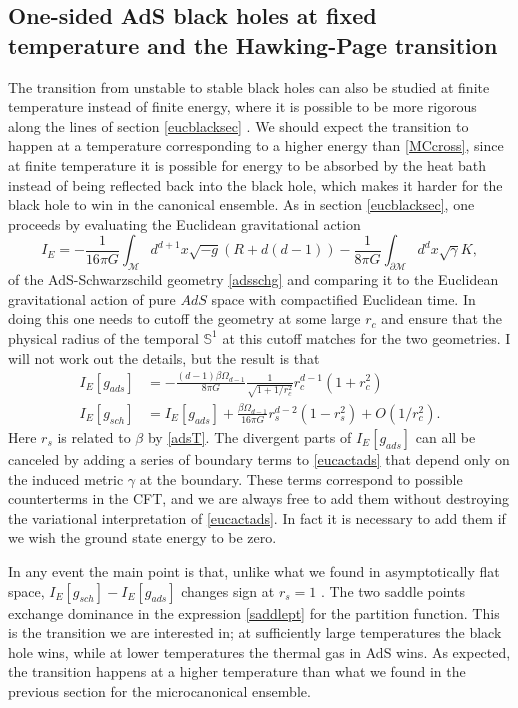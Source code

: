\documentclass[12pt]{article}
\newcommand{\be}{\begin{equation}}
\newcommand{\ee}{\end{equation}}
\begin{document}
\subsection{One-sided AdS black holes at fixed temperature and the Hawking-Page transition}
The transition from unstable to stable black holes can also be studied at finite temperature instead of finite energy, where it is possible to be more rigorous along the lines of section \eqref{eucblacksec} \cite{Hawking:1982dh,Witten:1998zw}.  We should expect the transition to happen at a temperature corresponding to a higher energy than \eqref{MCcross}, since at finite temperature it is possible for energy to be absorbed by the heat bath instead of being reflected back into the black hole, which makes it harder for the black hole to win in the canonical ensemble.  As in section \eqref{eucblacksec}, one proceeds by evaluating the Euclidean gravitational action 
\be\label{eucactads}
I_E=-\frac{1}{16\pi G}\int_{\mathcal{M}} d^{d+1}x \sqrt{-g}\left(R+d(d-1)\right)-\frac{1}{8\pi G}\int_{\partial \mathcal{M}} d^{d}x \sqrt{\gamma}K,
\ee
of the AdS-Schwarzschild geometry \eqref{adsschg} and comparing it to the Euclidean gravitational action of pure $AdS$ space with compactified Euclidean time.  In doing this one needs to cutoff the geometry at some large $r_c$ and ensure that the physical radius of the temporal $\mathbb{S}^1$ at this cutoff matches for the two geometries.  I will not work out the details, but the result is that 
\begin{align}\nonumber
I_E[g_{ads}]&=-\frac{(d-1)\beta \Omega_{d-1}}{8\pi G}\frac{1}{\sqrt{1+1/r_c^2}}r_c^{d-1}(1+r_c^2)\\
I_E[g_{sch}]&=I_E[g_{ads}]+\frac{\beta\Omega_{d-1}}{16\pi G}r_s^{d-2}\left(1-r_s^2\right)+O(1/r_c^2).
\end{align}
Here $r_s$ is related to $\beta$ by \eqref{adsT}.  The divergent parts of $I_E[g_{ads}]$ can all be canceled by adding a series of boundary terms to \eqref{eucactads} that depend only on the induced metric $\gamma$ at the boundary.  These terms correspond to possible counterterms in the CFT, and we are always free to add them without destroying the variational interpretation of \eqref{eucactads}.  In fact it is necessary to add them if we wish the ground state energy to be zero.

In any event the main point is that, unlike what we found in asymptotically flat space, $I_E[g_{sch}]-I_E[g_{ads}]$ changes sign at $r_s=1$ \cite{Hawking:1982dh}.  The two saddle points exchange dominance in the expression \eqref{saddlept} for the partition function.  This is the transition we are interested in; at sufficiently large temperatures the black hole wins, while at lower temperatures the thermal gas in AdS wins.  As expected, the transition happens at a higher temperature than what we found in the previous section for the microcanonical ensemble.  
\end{document}
